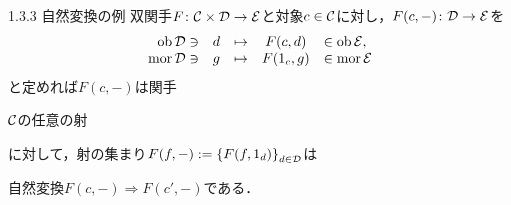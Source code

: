 \documentclass[uplatex,a4paper,dvipdfmx,aspectratio=169,10pt]{beamer}
\begin{document}
\begin{frame}[fragile]{1.3.3 自然変換の例}
     双関手$F \colon \mathcal{C} \times \mathcal{D} \to \mathcal{E}$と対象$c \in \mathcal{C}$に対し，$F(c, -) \colon \mathcal{D} \to \mathcal{E}$を
    \begin{equation*}
        \begin{array}{rcccl}
            \ob \Dcal \ni & d & \mapsto & F(c, d) & \in \ob \Ecal \rlap{,} \\
            \mor \Dcal \ni & g & \mapsto & F(1_c, g) & \in \mor \Ecal
        \end{array}
    \end{equation*}
    と定めれば$F(c, -)$は関手
    \begin{exampleblock}{}
        $\mathcal{C}$の任意の射に対して，射の集まり$F(f, -) := \qty{F(f, 1_d)}_{d \in \mathcal{D}}$は

        自然変換$F(c, -) \Rightarrow F(c', -)$である．
    \end{exampleblock}
\end{frame}
\end{document}
